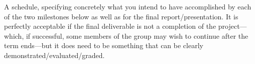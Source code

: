 A schedule, specifying concretely what you intend to have accomplished by each of the two milestones below as well as for the final report/presentation. It is perfectly acceptable if the final deliverable is not a completion of the project---which, if successful, some members of the group may wish to continue after the term ends---but it does need to be something that can be clearly demonstrated/evaluated/graded.

